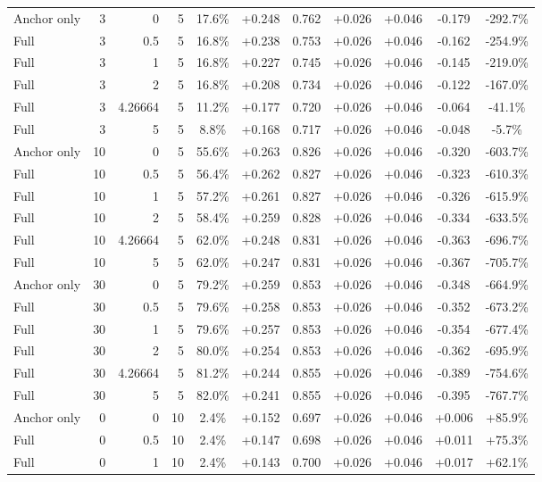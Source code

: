 \begin{table}[htbp]
\begin{tabular}{lrrrccccccc}
Anchor only & 3 & 0 & 5 & 17.6\% & +0.248 & 0.762 & +0.026 & +0.046 & -0.179 & -292.7\% \\
Full & 3 & 0.5 & 5 & 16.8\% & +0.238 & 0.753 & +0.026 & +0.046 & -0.162 & -254.9\% \\
Full & 3 & 1 & 5 & 16.8\% & +0.227 & 0.745 & +0.026 & +0.046 & -0.145 & -219.0\% \\
Full & 3 & 2 & 5 & 16.8\% & +0.208 & 0.734 & +0.026 & +0.046 & -0.122 & -167.0\% \\
Full & 3 & 4.26664 & 5 & 11.2\% & +0.177 & 0.720 & +0.026 & +0.046 & -0.064 & -41.1\% \\
Full & 3 & 5 & 5 & 8.8\% & +0.168 & 0.717 & +0.026 & +0.046 & -0.048 & -5.7\% \\
Anchor only & 10 & 0 & 5 & 55.6\% & +0.263 & 0.826 & +0.026 & +0.046 & -0.320 & -603.7\% \\
Full & 10 & 0.5 & 5 & 56.4\% & +0.262 & 0.827 & +0.026 & +0.046 & -0.323 & -610.3\% \\
Full & 10 & 1 & 5 & 57.2\% & +0.261 & 0.827 & +0.026 & +0.046 & -0.326 & -615.9\% \\
Full & 10 & 2 & 5 & 58.4\% & +0.259 & 0.828 & +0.026 & +0.046 & -0.334 & -633.5\% \\
Full & 10 & 4.26664 & 5 & 62.0\% & +0.248 & 0.831 & +0.026 & +0.046 & -0.363 & -696.7\% \\
Full & 10 & 5 & 5 & 62.0\% & +0.247 & 0.831 & +0.026 & +0.046 & -0.367 & -705.7\% \\
Anchor only & 30 & 0 & 5 & 79.2\% & +0.259 & 0.853 & +0.026 & +0.046 & -0.348 & -664.9\% \\
Full & 30 & 0.5 & 5 & 79.6\% & +0.258 & 0.853 & +0.026 & +0.046 & -0.352 & -673.2\% \\
Full & 30 & 1 & 5 & 79.6\% & +0.257 & 0.853 & +0.026 & +0.046 & -0.354 & -677.4\% \\
Full & 30 & 2 & 5 & 80.0\% & +0.254 & 0.853 & +0.026 & +0.046 & -0.362 & -695.9\% \\
Full & 30 & 4.26664 & 5 & 81.2\% & +0.244 & 0.855 & +0.026 & +0.046 & -0.389 & -754.6\% \\
Full & 30 & 5 & 5 & 82.0\% & +0.241 & 0.855 & +0.026 & +0.046 & -0.395 & -767.7\% \\
Anchor only & 0 & 0 & 10 & 2.4\% & +0.152 & 0.697 & +0.026 & +0.046 & +0.006 & +85.9\% \\
Full & 0 & 0.5 & 10 & 2.4\% & +0.147 & 0.698 & +0.026 & +0.046 & +0.011 & +75.3\% \\
Full & 0 & 1 & 10 & 2.4\% & +0.143 & 0.700 & +0.026 & +0.046 & +0.017 & +62.1\% \\

\end{tabular}
\end{table}
